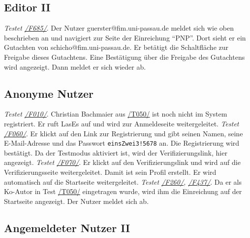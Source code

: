 \subsection{Editor II}
\begin{description}

	 \emph{Testet \hyperref[funkt:685]{/F685/}}.
	Der Nutzer guerster@fim.uni-passau.de meldet sich wie oben beschrieben an und navigiert zur Seite der Einreichung ``P\neq NP''.
	Dort sieht er ein Gutachten von schicho@fim.uni-passau.de.
	Er betätigt die Schaltfläche zur Freigabe dieses Gutachtens.
	Eine Bestätigung über die Freigabe des Gutachtens wird angezeigt.
	Dann meldet er sich wieder ab.

\end{description}

\subsection{Anonyme Nutzer}

\begin{description}
	 \emph{Testet \hyperref[funkt:010]{/F010/}}.
	Christian Bachmaier aus \hyperref[t050]{/T050/} ist noch nicht im System registriert.
	Er ruft LasEs auf und wird zur Anmeldeseite weitergeleitet.
	 \emph{Testet \hyperref[funkt:060]{/F060/}}.
	Er klickt auf den Link zur Registrierung und gibt seinen Namen, seine E-Mail-Adresse und das Passwort \texttt{einsZwei3!5678} an.
	Die Registrierung wird bestätigt.
	Da der Testmodus aktiviert ist, wird der Verifizierungslink, hier angezeigt.
	 \emph{Testet \hyperref[funkt:070]{/F070/}}.
	Er klickt auf den Verifizierungslink und wird auf die Verifizierungsseite weitergeleitet.
	Damit ist sein Profil erstellt.
	Er wird automatisch auf die Startseite weitergeleitet.
	 \emph{Testet \hyperref[funkt:260]{/F260/}, \hyperref[funkt:437]{/F437/}}.
	Da er als Ko-Autor in Test \hyperref[t050]{/T050/} eingetragen wurde, wird ihm die Einreichung auf der Startseite angezeigt.
	Der Nutzer meldet sich ab.
\end{description}

\subsection{Angemeldeter Nutzer II}

